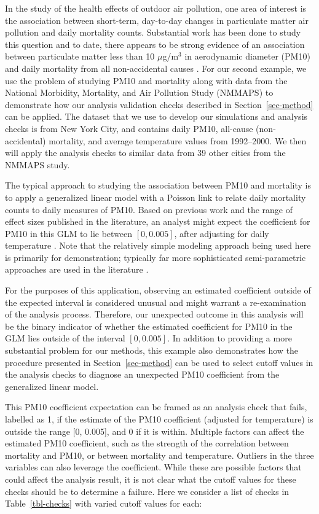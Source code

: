 \documentclass[
  12pt,
]{interact}
\begin{document}
In the study of the health effects of outdoor air pollution, one area of
interest is the association between short-term, day-to-day changes in
particulate matter air pollution and daily mortality counts. Substantial
work has been done to study this question and to date, there appears to
be strong evidence of an association between particulate matter less
than 10 \(\mu\)g/m\(^3\) in aerodynamic diameter (PM10) and daily
mortality from all non-accidental causes \citep{samet2000fine}. For our
second example, we use the problem of studying PM10 and mortality along
with data from the National Morbidity, Mortality, and Air Pollution
Study (NMMAPS) to demonstrate how our analysis validation checks
described in Section~\ref{sec-method} can be applied. The dataset that
we use to develop our simulations and analysis checks is from New York
City, and contains daily PM10, all-cause (non-accidental) mortality, and
average temperature values from 1992--2000. We then will apply the
analysis checks to similar data from 39 other cities from the NMMAPS
study.

The typical approach to studying the association between PM10 and
mortality is to apply a generalized linear model with a Poisson link to
relate daily mortality counts to daily measures of PM10. Based on
previous work and the range of effect sizes published in the literature,
an analyst might expect the coefficient for PM10 in this GLM to lie
between \([0, 0.005]\), after adjusting for daily temperature
\citep{samet2000fine, welty2005acute}. Note that the relatively simple
modeling approach being used here is primarily for demonstration;
typically far more sophisticated semi-parametric approaches are used in
the literature \citep{peng2006model}.

For the purposes of this application, observing an estimated coefficient
outside of the expected interval is considered unusual and might warrant
a re-examination of the analysis process. Therefore, our unexpected
outcome in this analysis will be the binary indicator of whether the
estimated coefficient for PM10 in the GLM lies outside of the interval
\([0, 0.005]\). In addition to providing a more substantial problem for
our methods, this example also demonstrates how the procedure presented
in Section~\ref{sec-method} can be used to select cutoff values in the
analysis checks to diagnose an unexpected PM10 coefficient from the
generalized linear model.

This PM10 coefficient expectation can be framed as an analysis check
that fails, labelled as 1, if the estimate of the PM10 coefficient
(adjusted for temperature) is outside the range {[}0, 0.005{]}, and 0 if
it is within. Multiple factors can affect the estimated PM10
coefficient, such as the strength of the correlation between mortality
and PM10, or between mortality and temperature. Outliers in the three
variables can also leverage the coefficient. While these are possible
factors that could affect the analysis result, it is not clear what the
cutoff values for these checks should be to determine a failure. Here we
consider a list of checks in Table~\ref{tbl-checks} with varied cutoff
values for each:
\end{document}
